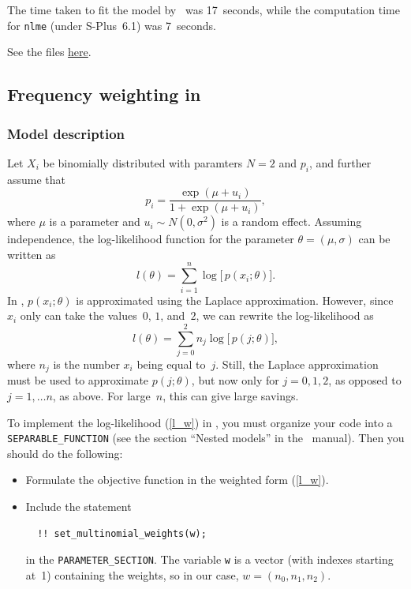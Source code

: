 \documentclass{admbmanual}
\begin{document}
The time taken to fit the model by \scAR\ was 17~seconds, while the computation
time for \texttt{nlme} (under S-Plus~6.1) was 7~seconds.

See the files
\href{http://otter-rsch.com/admbre/examples/pheno/pheno.html}{here}.

\subsection{Frequency weighting in \scAR}
\label{seq:frequency_example}

\subsubsection{Model description}

Let $X_{i}$ be binomially distributed with paramters $N=2$ and $p_{i}$, and
further assume that
\begin{equation}
p_{i}=\frac{\exp (\mu +u_{i})}{1+\exp (\mu +u_{i})},
\end{equation}%
where $\mu $ is a parameter and $u_{i}\sim N(0,\sigma ^{2})$ is a random effect.
Assuming independence, the log-likelihood function for the parameter $\theta
=(\mu ,\sigma )$ can be written as
\begin{equation}
l(\theta )=\sum_{i=1}^{n}\log \bigl[\, p(x_{i};\theta )\bigr] .
\end{equation}%
In \scAR, $p(x_{i};\theta )$ is approximated using the Laplace approximation.
However, since $x_{i}$ only can take the values~$0$, $1$, and~$2$, we can
rewrite the log-likelihood as
\begin{equation}
l(\theta )=\sum_{j=0}^{2}n_{j}\log \bigl[\, p(j;\theta )\bigr] ,  \label{l_w}
\end{equation}%
where $n_{j}$ is the number $x_{i}$ being equal to~$j$. Still, the Laplace
approximation must be used to approximate $p(j;\theta )$, but now only for
$j=0,1,2$, as opposed to $j = 1,\dots n$, as above. For large~$n$, this can give
large savings.

To implement the log-likelihood (\ref{l_w}) in \scAR, you must organize your
code into a \texttt{SEPARABLE\_FUNCTION} (see the section ``Nested models'' in
the \scAR\ manual). Then you should do the following:
\begin{itemize}
  \item Formulate the objective function in the weighted form (\ref{l_w}).

  \item Include the statement
  \begin{lstlisting}
  !! set_multinomial_weights(w);
  \end{lstlisting}
in the \texttt{PARAMETER\_SECTION}. The variable \texttt{w} is a vector (with
indexes starting at~1) containing the weights, so in our case,
$w=(n_{0},n_{1},n_{2})$.
\end{itemize}
\end{document}
